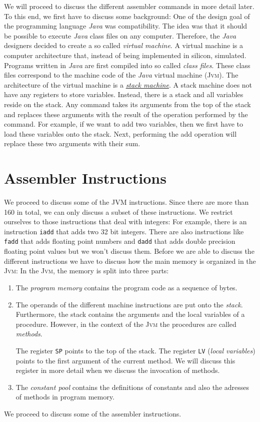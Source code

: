 We will proceed to discuss the different assembler commands in more detail later.  To this end, we
first have to discuss some background: One of the design goal of the programming language
\textsl{Java} was compatibility.  The idea was 
that it should be possible to execute \textsl{Java} class files on any computer.  Therefore, the
\textsl{Java} designers decided to create a so called \emph{virtual machine}.  A virtual machine is
a computer architecture that, instead of being implemented in silicon, simulated. 
Programs written in \textsl{Java} are first compiled into so called \emph{class files}.  These class
files correspond to the machine code of the \textsl{Java} virtual machine (\textsc{Jvm}).  
The architecture of the virtual machine is a 
\href{http://en.wikipedia.org/wiki/Stack_machine}{\emph{stack machine}}. 
A stack machine does not have any registers to store variables.  Instead, there is a stack and all
variables reside on the stack.  Any command takes its arguments from the top of the stack and
replaces these arguments with the result of the operation performed by the command.
For example, if we want to add two variables, then we first have to
load these variables onto the stack.  Next, performing the add operation will replace these two
arguments with their sum.


\section{Assembler Instructions}
We proceed to discuss some of the \textsc{JVM} instructions.  Since there are more than 160 in
total, we can only discuss a subset of these instructions.  We restrict ourselves to those
instructions that deal with integers:  For example, there is an instruction \texttt{iadd} that adds
two 32 bit integers.  There are also instructions like \texttt{fadd} that adds floating point
numbers and \texttt{dadd} that adds double precision floating point values but we won't discuss
them.  Before we are able to discuss the different instructions we have to discuss how the main
memory is organized in the \textsc{Jvm}: In the \textsc{Jvm}, the memory is split into three parts:
\begin{enumerate}
\item The \emph{program memory} contains the program code as a sequence of bytes.
\item The operands of the different machine instructions are put onto the \emph{stack}.
      Furthermore, the stack contains the arguments and the local variables of a procedure.
      However, in the context of the \textsc{Jvm} the procedures are called \emph{methods}.

      The register \texttt{SP} points to the top of the stack.
      The register \texttt{LV} (\emph{local variables}) points to the first argument of the current
      method.   We will discuss this register in more detail when we discuss the invocation of
      methods. 
\item The \emph{constant pool} contains the definitions of constants and also the adresses of
      methods in program memory.
\end{enumerate}
We proceed to discuss some of the assembler instructions.

